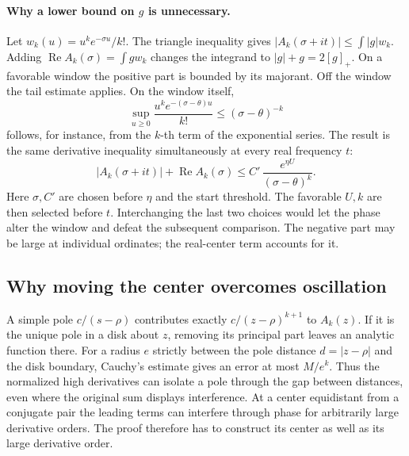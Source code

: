 \documentclass[12pt,letterpaper]{article}
\begin{document}
\paragraph{Why a lower bound on \(g\) is unnecessary.}
Let \(w_k(u)=u^ke^{-\sigma u}/k!\). The triangle inequality gives \(|A_k(\sigma+it)|\le\int|g|w_k\). Adding \(\operatorname{Re}A_k(\sigma)=\int g w_k\) changes the integrand to \(|g|+g=2[g]_+\). On a favorable window the positive part is bounded by its majorant. Off the window the tail estimate applies. On the window itself,
\[
  \sup_{u\ge0}\frac{u^ke^{-(\sigma-\theta)u}}{k!}
           \le(\sigma-\theta)^{-k}
\]
follows, for instance, from the \(k\)-th term of the exponential series. The result is the same derivative inequality simultaneously at every real frequency \(t\):
\begin{equation}
 |A_k(\sigma+it)|+\operatorname{Re}A_k(\sigma)
          \le C'\,\frac{e^{\eta U}}{(\sigma-\theta)^k}.          \label{eq:wz-derivative}
\end{equation}
Here \(\sigma,C'\) are chosen before \(\eta\) and the start threshold. The favorable \(U,k\) are then selected before \(t\). Interchanging the last two choices would let the phase alter the window and defeat the subsequent comparison. The negative part may be large at individual ordinates; the real-center term accounts for it.  

\subsection{Why moving the center overcomes oscillation}
A simple pole \(c/(s-\rho)\) contributes exactly \(c/(z-\rho)^{k+1}\) to \(A_k(z)\). If it is the unique pole in a disk about \(z\), removing its principal part leaves an analytic function there. For a radius \(e\) strictly between the pole distance \(d=|z-\rho|\) and the disk boundary, Cauchy's estimate gives an error at most \(M/e^k\). Thus the normalized high derivatives can isolate a pole through the gap between distances, even where the original sum displays interference. At a center equidistant from a conjugate pair the leading terms can interfere through phase for arbitrarily large derivative orders. The proof therefore has to construct its center as well as its large derivative order.  
\end{document}
